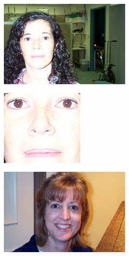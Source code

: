 \begin{figure}[H]
\begin{subfigure}{0.65\textwidth}
\begin{subfigure}{.33\textwidth}
  \centering
  \includegraphics[width=0.95\textwidth]{img/fdResult1/input66.png}
  \caption{}
\end{subfigure}%
\begin{subfigure}{.33\textwidth}
  \centering
  \includegraphics[width=0.6\textwidth]{img/fdResult1/output66.png}
  \caption{}
\end{subfigure}%
\end{subfigure}%
\begin{subfigure}{0.65\textwidth}
\begin{subfigure}{.33\textwidth}
  \centering
  \includegraphics[width=0.95\textwidth]{img/fdResult1/input76.png}

\end{subfigure}
\end{subfigure}
\end{figure}
